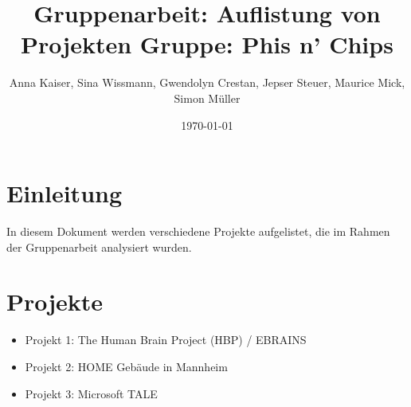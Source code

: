\documentclass{article}
\title{Gruppenarbeit: Auflistung von Projekten Gruppe: Phis n' Chips}
\author{Anna Kaiser, Sina Wissmann, Gwendolyn Crestan, Jepser Steuer, Maurice Mick, Simon Müller}
\date{\today}
\begin{document}
\maketitle 
\section{Einleitung}
In diesem Dokument werden verschiedene Projekte aufgelistet, die im Rahmen der Gruppenarbeit analysiert wurden.


\newpage

\section{Projekte}
\begin{itemize}
    \item Projekt 1: The Human Brain Project (HBP) / EBRAINS
    \item Projekt 2: HOME Gebäude in Mannheim
    \item Projekt 3: Microsoft TALE
\end{itemize}
\end{document}
